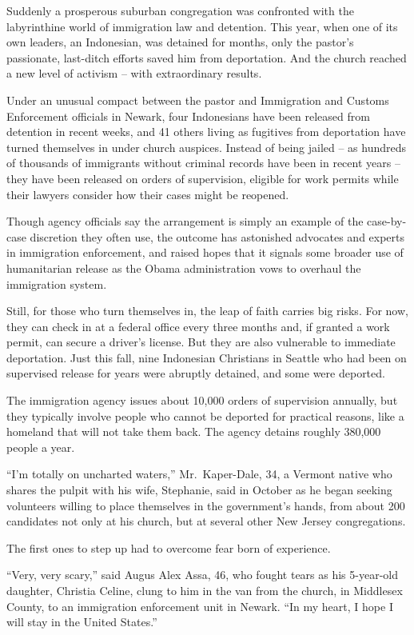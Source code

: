 ﻿\documentclass[12pt]{article}
\begin{document}
Suddenly a prosperous suburban congregation was confronted with the labyrinthine world of
immigration law and detention. This year, when one of its own leaders, an Indonesian, was detained
for months, only the pastor's passionate, last-ditch efforts saved him from deportation. And the
church reached a new level of activism -- with extraordinary results.

Under an unusual compact between the pastor and Immigration and Customs Enforcement officials in
Newark, four Indonesians have been released from detention in recent weeks, and 41 others living as
fugitives from deportation have turned themselves in under church auspices. Instead of being jailed
-- as hundreds of thousands of immigrants without criminal records have been in recent years -- they
have been released on orders of supervision, eligible for work permits while their lawyers consider
how their cases might be reopened.

Though agency officials say the arrangement is simply an example of the case-by-case discretion they
often use, the outcome has astonished advocates and experts in immigration enforcement, and raised
hopes that it signals some broader use of humanitarian release as the Obama administration vows to
overhaul the immigration system.

Still, for those who turn themselves in, the leap of faith carries big risks. For now, they can
check in at a federal office every three months and, if granted a work permit, can secure a driver's
license. But they are also vulnerable to immediate deportation. Just this fall, nine Indonesian
Christians in Seattle who had been on supervised release for years were abruptly detained, and some
were deported.

The immigration agency issues about 10,000 orders of supervision annually, but they typically
involve people who cannot be deported for practical reasons, like a homeland that will not take them
back. The agency detains roughly 380,000 people a year.

``I'm totally on uncharted waters,'' Mr.~Kaper-Dale, 34, a Vermont native who shares the pulpit with
his wife, Stephanie, said in October as he began seeking volunteers willing to place themselves in
the government's hands, from about 200 candidates not only at his church, but at several other New
Jersey congregations.

The first ones to step up had to overcome fear born of experience.

``Very, very scary,'' said Augus Alex Assa, 46, who fought tears as his 5-year-old daughter,
Christia Celine, clung to him in the van from the church, in Middlesex County, to an immigration
enforcement unit in Newark. ``In my heart, I hope I will stay in the United States.''
\end{document}
